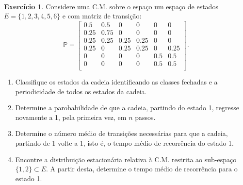 \documentclass[
  11pt,
  a4paper,
]{book}
\theoremstyle{definition}
\theoremstyle{definition}
\theoremstyle{definition}
\newtheorem{exercise}{Exercício}[chapter]
\theoremstyle{definition}
\theoremstyle{remark}
\begin{document}
\(\,\)

\begin{exercise}

Considere uma C.M. sobre o espaço um espaço de estados \(E=\{1,2,3,4,5,6\}\) e com matriz de transição:
\[
\mathbb{P} =
\begin{bmatrix}
0.5 & 0.5 & 0 & 0 & 0 & 0  \\
0.25 & 0.75 & 0 & 0 & 0 & 0  \\
0.25 & 0.25 & 0.25 & 0.25 & 0 & 0  \\
0.25 & 0 & 0.25 & 0.25 & 0 & 0.25  \\
0 & 0 & 0 & 0 & 0.5 & 0.5  \\
0 & 0 & 0 & 0 & 0.5 & 0.5  \\
\end{bmatrix}.
\]

\begin{enumerate}
\def\labelenumi{(\alph{enumi})}
\item
  Classifique os estados da cadeia identificando as classes fechadas e a periodicidade de todos os estados da cadeia.
\item
  Determine a parobabilidade de que a cadeia, partindo do estado 1, regresse novamente a 1, pela primeira vez, em \(n\) passos.
\item
  Determine o número médio de transições necessárias para que a cadeia, partindo de 1 volte a 1, isto é, o tempo médio de recorrência do estado 1.
\item
  Encontre a distribuição estacionária relativa à C.M. restrita ao sub-espaço \(\{1,2\} \subset E\). A partir desta, determine o tempo médio de recorrência para o estado 1.
\end{enumerate}

\end{exercise}

\(\,\)
\end{document}
